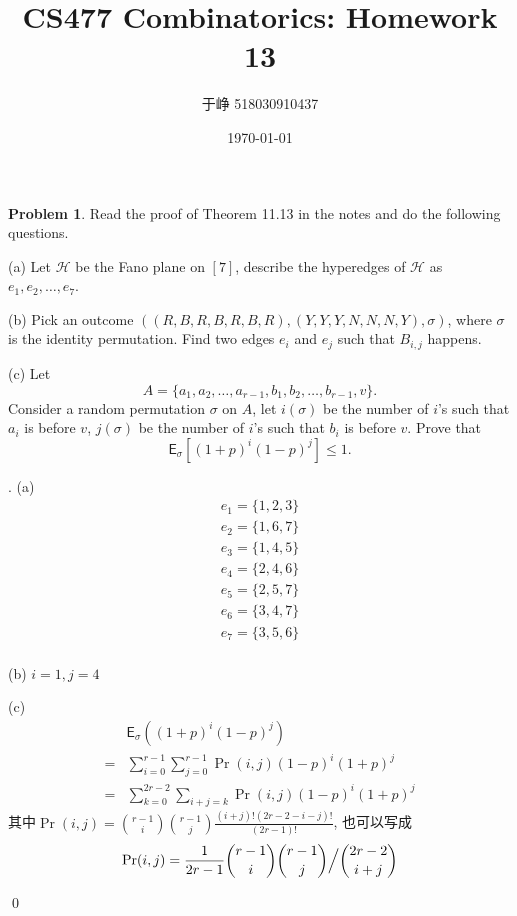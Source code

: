 \documentclass[UTF8]{ctexart}
\newenvironment{sol}
  {\par\vspace{3mm}\noindent{\it Solution}.}
  {\qed \\ \medskip}
\newcommand{\expe}{{\mathsf E}}
\theoremstyle{definition}
\newtheorem{problem}{Problem}
\begin{document}
\title{CS477 Combinatorics: Homework 13}

\author{于峥 518030910437}
\date{\today}

\maketitle

\begin{problem}
Read the proof of Theorem 11.13 in the notes and do the following questions.

(a) Let $\mathcal{H}$ be the Fano plane on $[7]$, describe the hyperedges of $\mathcal{H}$ as $e_1, e_2, \dots, e_7$.

(b) Pick an outcome $((R, B, R, B, R, B, R), (Y, Y, Y, N, N, N, Y), \sigma)$, where $\sigma$ is the identity permutation. Find 
two edges $e_i$ and $e_j$ such that $B_{i,j}$ happens.

(c) Let
\[
A = \{a_1, a_2, \dots, a_{r-1}, b_1, b_2, \dots, b_{r-1}, v \}.
\]
Consider a random permutation $\sigma$ on $A$, let $i(\sigma)$ be the number of $i$'s such that $a_i$ is before $v$,
$j(\sigma)$ be the number of $i$'s such that $b_i$ is before $v$. Prove that
\[
\expe_\sigma [(1+p)^i (1-p)^j] \leq 1.
\]

\begin{sol}
  (a)
  \begin{align*}
      e_1 = \{ 1, 2, 3 \} \\
      e_2 = \{ 1, 6, 7 \} \\
      e_3 = \{ 1, 4, 5 \} \\
      e_4 = \{ 2, 4, 6 \} \\
      e_5 = \{ 2, 5, 7 \} \\
      e_6 = \{ 3, 4, 7 \} \\
      e_7 = \{ 3, 5, 6 \} \\
  \end{align*}

  (b) $i = 1, j = 4$

  (c) 
  \begin{align*}
  &\expe_\sigma((1+p)^i(1-p)^j) \\
  =&\sum_{i=0}^{r-1}\sum_{j=0}^{r-1} \Pr(i, j) (1-p)^i(1+p)^j \\
  =&\sum_{k=0}^{2r-2} \sum_{i+j=k} \Pr(i,j)(1-p)^i(1+p)^j
  \end{align*}
  其中$\Pr(i, j) = \binom{r-1}{i}\binom{r-1}{j} \frac {(i+j)!(2r-2-i-j)!}{(2r-1)!}$, 也可以写成
  $$
  \Pr(i, j) = \frac 1 {2r-1}\binom{r-1}{i}\binom{r-1}{j} \Big{/} \binom{2r-2}{i+j}
  $$
  

\end{sol}
\end{problem}
\end{document}
